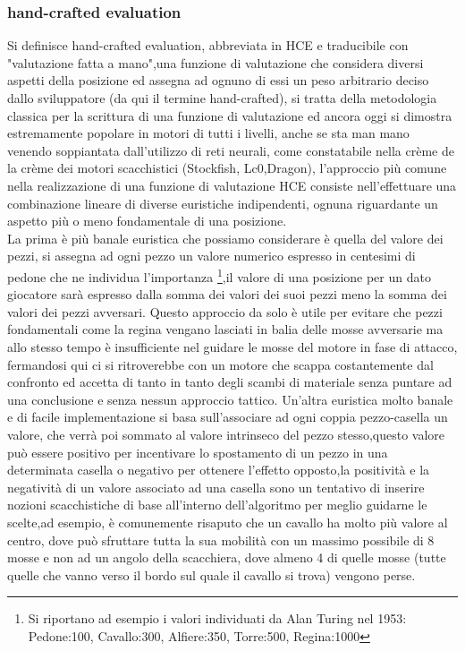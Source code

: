 \subsubsection {hand-crafted evaluation}
Si definisce hand-crafted evaluation, abbreviata in HCE e traducibile con "valutazione fatta a mano",una funzione di valutazione che considera diversi aspetti della posizione ed assegna ad ognuno di essi un peso 
arbitrario deciso dallo sviluppatore (da qui il termine hand-crafted), si tratta della metodologia classica per la scrittura di una funzione di valutazione ed ancora oggi si dimostra estremamente popolare in  
motori di tutti i livelli, anche se sta man mano venendo soppiantata dall'utilizzo di reti neurali, come constatabile nella crème de la crème dei motori scacchistici (Stockfish, Lc0,Dragon), l'approccio più comune
nella realizzazione di una funzione di valutazione HCE consiste nell'effettuare una combinazione lineare di diverse euristiche indipendenti, ognuna riguardante un aspetto più o meno fondamentale di una posizione.
\\La prima è più banale euristica che possiamo considerare è quella del valore dei pezzi, si assegna ad ogni pezzo un valore numerico espresso in centesimi di pedone che ne individua l'importanza \footnote{Si riportano ad esempio i valori individuati
da Alan Turing nel 1953: Pedone:100, Cavallo:300, Alfiere:350, Torre:500, Regina:1000},il valore di una posizione per un dato giocatore sarà espresso dalla somma dei valori dei suoi pezzi meno la somma dei valori dei pezzi avversari.
Questo approccio da solo è utile per evitare che  pezzi fondamentali come la regina vengano lasciati in balia delle mosse avversarie ma allo stesso tempo è insufficiente nel guidare le mosse del motore in fase di attacco,
fermandosi qui ci si ritroverebbe con un motore che scappa costantemente dal confronto ed accetta di tanto in tanto degli scambi di materiale senza puntare ad una conclusione e senza nessun approccio tattico.
Un'altra euristica molto banale e di facile implementazione si basa sull'associare ad ogni coppia pezzo-casella un valore, che verrà poi sommato al valore intrinseco del pezzo stesso,questo valore può essere positivo
per incentivare lo spostamento di un pezzo in una determinata casella o negativo per ottenere l'effetto opposto,la positività e la negatività di un valore associato ad una casella sono un tentativo di inserire 
nozioni scacchistiche di base all'interno dell'algoritmo per meglio guidarne le scelte,ad esempio, è comunemente risaputo che un cavallo ha molto più valore al centro, dove può sfruttare tutta la sua mobilità 
con un massimo possibile di 8 mosse e non ad un angolo della scacchiera, dove almeno 4 di quelle mosse  (tutte quelle che vanno verso il bordo sul quale il cavallo si trova) vengono perse.

